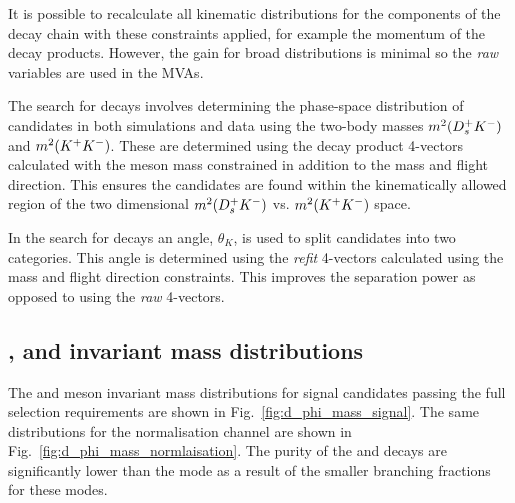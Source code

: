 It is possible to recalculate all kinematic distributions for the components of the decay chain with these constraints applied, for example the momentum of the decay products. 
However, the gain for broad distributions is minimal so the \emph{raw} variables are used in the MVAs. 

The search for \decay{\Bp}{\Dsp\Kp\Km} decays involves determining the phase-space distribution of candidates in both simulations and data using the two-body masses $m^{2}({{D}^+_{s}}{{K}^-})$ and $m^{2}({{K}^+}{{K}^-})$. These are determined using the decay product 4-vectors calculated with the \Bp meson mass constrained in addition to the \Dsp mass and \Bp flight direction. This ensures the candidates are found within the kinematically allowed region of the two dimensional $m^{2}({{D}^+_{s}}{{K}^-})$ vs. $m^{2}({{K}^+}{{K}^-})$ space.

In the search for \decay{\Bp}{\Dsp\phiz} decays an angle, $\theta_{K}$, is used to split candidates into two categories. This angle is determined using the \emph{refit} 4-vectors calculated using the \Dsp mass and \Bp flight direction constraints. This improves the separation power as opposed to using the \emph{raw} 4-vectors.  



\subsection{\Dsp, \phiz and \Dzb invariant mass distributions}

The \Dsp and \phiz meson invariant mass distributions for signal \decay{\Bp}{\Dsp\phiz} candidates passing the full selection requirements are shown in Fig.~\ref{fig:d_phi_mass_signal}. The same distributions for the normalisation channel \decay{\Bp}{\Dsp\Dzb} are shown in Fig.~\ref{fig:d_phi_mass_normlaisation}. The purity of the \decay{\Dsp}{\pip\pim\pip} and \decay{\Dsp}{\Kp\pim\pip} decays are significantly lower than the \decay{\Dsp}{\Kp\Km\pip} mode as a result of the smaller branching fractions for these modes. 


